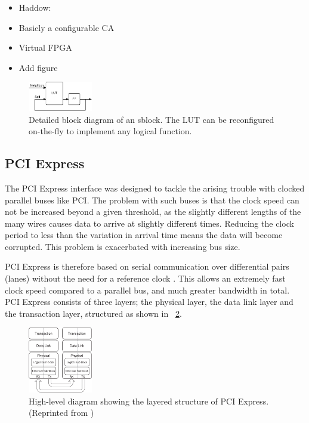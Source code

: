 \begin{itemize}
    \item Haddow: \cite{haddow2000sblock}
    \item Basicly a configurable CA
    \item Virtual FPGA
    \item Add figure
\end{itemize}

\begin{figure}[!ht]
    \centering
    \includegraphics[width=0.25\textwidth]{figures/sblock}
    \caption{Detailed block diagram of an sblock. The LUT can be reconfigured on-the-fly to implement any logical function.}
    \label{fig:sblock}
\end{figure}

\subsection{PCI Express}

The PCI Express interface was designed to tackle the arising trouble with clocked parallel buses like PCI.
The problem with such buses is that the clock speed can not be increased beyond a given threshold, as the slightly different lengths of the many wires causes data to arrive at slightly different times.
Reducing the clock period to less than the variation in arrival time means the data will become corrupted.
This problem is exacerbated with increasing bus size.

PCI Express is therefore based on serial communication over differential pairs (lanes\footnotemark) without the need for a reference clock \cite{pcie}.
This allows an extremely fast clock speed compared to a parallel bus, and much greater bandwidth in total.
PCI Express consists of three layers; the physical layer, the data link layer and the transaction layer, structured as shown in \figurename~\ref{fig:pcie}.

\begin{figure}[!ht]
    \centering
    \includegraphics[width=0.25\textwidth]{figures/pcie}
    \caption{High-level diagram showing the layered structure of PCI Express. (Reprinted from \cite{pcie})}
    \label{fig:pcie}
\end{figure}


